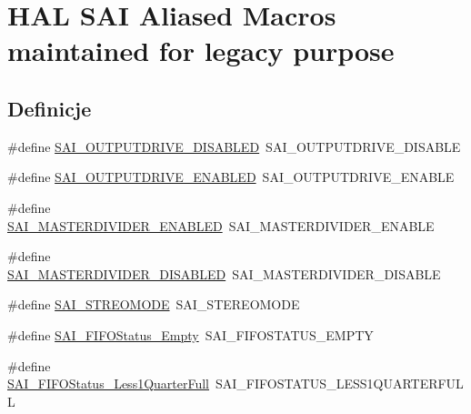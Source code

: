 \hypertarget{group___h_a_l___s_a_i___aliased___macros}{}\section{H\+AL S\+AI Aliased Macros maintained for legacy purpose}
\label{group___h_a_l___s_a_i___aliased___macros}
\subsection*{Definicje}
\begin{DoxyCompactItemize}
\item 
\#define \hyperlink{group___h_a_l___s_a_i___aliased___macros_ga22aec02ed4baaf3d21709c32946204f8}{S\+A\+I\+\_\+\+O\+U\+T\+P\+U\+T\+D\+R\+I\+V\+E\+\_\+\+D\+I\+S\+A\+B\+L\+ED}~S\+A\+I\+\_\+\+O\+U\+T\+P\+U\+T\+D\+R\+I\+V\+E\+\_\+\+D\+I\+S\+A\+B\+LE
\item 
\#define \hyperlink{group___h_a_l___s_a_i___aliased___macros_ga8f73390263eb0def04fa852f4dfed6b8}{S\+A\+I\+\_\+\+O\+U\+T\+P\+U\+T\+D\+R\+I\+V\+E\+\_\+\+E\+N\+A\+B\+L\+ED}~S\+A\+I\+\_\+\+O\+U\+T\+P\+U\+T\+D\+R\+I\+V\+E\+\_\+\+E\+N\+A\+B\+LE
\item 
\#define \hyperlink{group___h_a_l___s_a_i___aliased___macros_ga88e1e3ce068a5fc57c3889d5f81159e0}{S\+A\+I\+\_\+\+M\+A\+S\+T\+E\+R\+D\+I\+V\+I\+D\+E\+R\+\_\+\+E\+N\+A\+B\+L\+ED}~S\+A\+I\+\_\+\+M\+A\+S\+T\+E\+R\+D\+I\+V\+I\+D\+E\+R\+\_\+\+E\+N\+A\+B\+LE
\item 
\#define \hyperlink{group___h_a_l___s_a_i___aliased___macros_gadf64a1d4375f906f3cce84b8894c9aae}{S\+A\+I\+\_\+\+M\+A\+S\+T\+E\+R\+D\+I\+V\+I\+D\+E\+R\+\_\+\+D\+I\+S\+A\+B\+L\+ED}~S\+A\+I\+\_\+\+M\+A\+S\+T\+E\+R\+D\+I\+V\+I\+D\+E\+R\+\_\+\+D\+I\+S\+A\+B\+LE
\item 
\#define \hyperlink{group___h_a_l___s_a_i___aliased___macros_gacfe3531591ed56ede7be4ec404101369}{S\+A\+I\+\_\+\+S\+T\+R\+E\+O\+M\+O\+DE}~S\+A\+I\+\_\+\+S\+T\+E\+R\+E\+O\+M\+O\+DE
\item 
\#define \hyperlink{group___h_a_l___s_a_i___aliased___macros_ga975ffaf2925f238e84e4ec58ff07507a}{S\+A\+I\+\_\+\+F\+I\+F\+O\+Status\+\_\+\+Empty}~S\+A\+I\+\_\+\+F\+I\+F\+O\+S\+T\+A\+T\+U\+S\+\_\+\+E\+M\+P\+TY
\item 
\#define \hyperlink{group___h_a_l___s_a_i___aliased___macros_ga8bf03716c694dc3221b640dc5de670b6}{S\+A\+I\+\_\+\+F\+I\+F\+O\+Status\+\_\+\+Less1\+Quarter\+Full}~S\+A\+I\+\_\+\+F\+I\+F\+O\+S\+T\+A\+T\+U\+S\+\_\+\+L\+E\+S\+S1\+Q\+U\+A\+R\+T\+E\+R\+F\+U\+LL

\end{DoxyCompactItemize}
